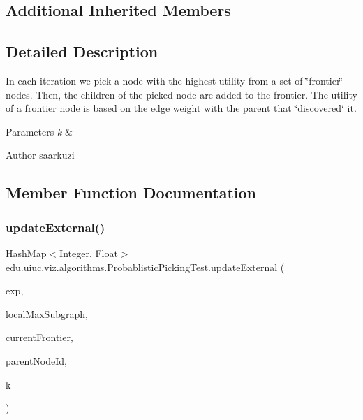 \subsection*{Additional Inherited Members}


\subsection{Detailed Description}
In each iteration we pick a node with the highest utility from a set of \char`\"{}frontier\char`\"{} nodes. Then, the children of the picked node are added to the frontier. The utility of a frontier node is based on the edge weight with the parent that \char`\"{}discovered\char`\"{} it.


\begin{DoxyParams}{Parameters}
{\em k} & \\
\hline
\end{DoxyParams}
\begin{DoxyAuthor}{Author}
saarkuzi 
\end{DoxyAuthor}


\subsection{Member Function Documentation}
\mbox{\label{classedu_1_1uiuc_1_1viz_1_1algorithms_1_1_probablistic_picking_test_a96642cd7cc4fbd22725028d61e3919b1}} 
\subsubsection{\texorpdfstring{updateExternal()}{updateExternal()}}
{\footnotesize\ttfamily Hash\+Map$<$Integer, Float$>$ edu.\+uiuc.\+viz.\+algorithms.\+Probablistic\+Picking\+Test.\+update\+External (\begin{DoxyParamCaption}\item[{\mbox{\hyperlink{classedu_1_1uiuc_1_1viz_1_1algorithms_1_1_experiment}{Experiment}}}]{exp,  }\item[{Array\+List$<$ Integer $>$}]{local\+Max\+Subgraph,  }\item[{Hash\+Map$<$ Integer, Float $>$}]{current\+Frontier,  }\item[{Integer}]{parent\+Node\+Id,  }\item[{Integer}]{k }\end{DoxyParamCaption})\hspace{0.3cm}{\ttfamily [protected]}}

